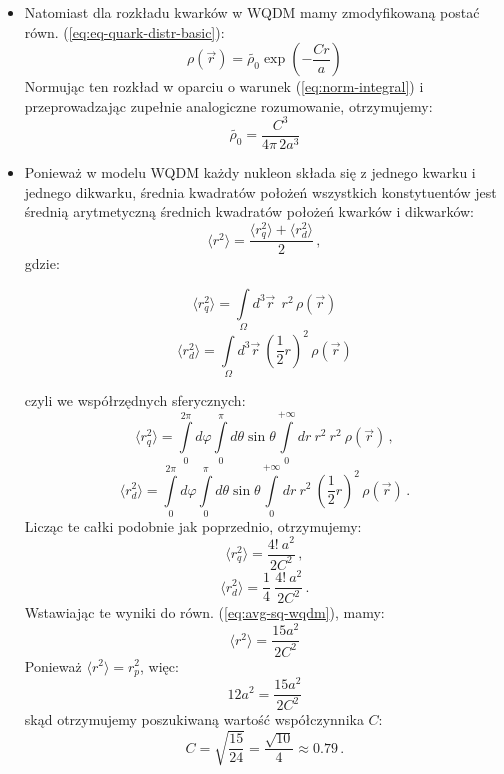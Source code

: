 \documentclass[a4paper,12pt]{article}
\begin{document}
\begin{itemize}
\item Natomiast dla rozkładu kwarków w WQDM mamy zmodyfikowaną postać równ. (\ref{eq:eq-quark-distr-basic}):
\begin{equation}
\rho(\vec{r}) = \widetilde{\rho_0} \exp\left(-\frac{Cr}{a}\right)
\end{equation}
Normując ten rozkład w oparciu o warunek (\ref{eq:norm-integral}) i przeprowadzając zupełnie analogiczne rozumowanie, otrzymujemy:
\begin{equation}\label{eq:coeff2}
\widetilde{\rho_0} = \frac{C^3}{4\pi \, 2a^3}
\end{equation}
\item Ponieważ w modelu WQDM każdy nukleon składa się z jednego kwarku i jednego dikwarku, średnia kwadratów położeń wszystkich konstytuentów jest średnią arytmetyczną średnich kwadratów położeń kwarków i dikwarków:
\begin{equation}\label{eq:avg-sq-wqdm}
\langle r^2 \rangle = \frac{\langle r_q^2 \rangle + \langle r_d^2 \rangle}{2}\,,
\end{equation}
gdzie: 

\begin{equation}
\langle r_q^2 \rangle = \int\limits_{\Omega} d^3\vec{r}\: \: r^2 \, \rho(\vec{r})
\end{equation}
\begin{equation}
\langle r_d^2 \rangle = \int\limits_{\Omega} d^3\vec{r}\: \left(\frac{1}{2}r\right)^2 \, \rho(\vec{r})
\end{equation}

czyli we współrzędnych sferycznych:
\[
\langle r_q^2 \rangle = \int\limits_{0}^{2\pi}d\varphi \int\limits_{0}^{\pi}d\theta \sin\theta \int\limits_{0}^{+\infty}dr \: r^2 \: r^2 \: \rho(\vec{r})\,,
\]
\[
\langle r_d^2 \rangle = \int\limits_{0}^{2\pi}d\varphi \int\limits_{0}^{\pi}d\theta \sin\theta \int\limits_{0}^{+\infty}dr \: r^2 \: \left(\frac{1}{2}r\right)^2 \, \rho(\vec{r})\,.
\]
Licząc te całki podobnie jak poprzednio, otrzymujemy:
\begin{equation}
\langle r_q^2 \rangle = \frac{4! \: a^2}{2C^2}\,,
\end{equation}
\begin{equation}
\langle r_d^2 \rangle = \frac{1}{4}\: \frac{4! \: a^2}{2C^2}\,.
\end{equation}
Wstawiając te wyniki do równ. (\ref{eq:avg-sq-wqdm}), mamy:
\begin{equation}
\langle r^2 \rangle = \frac{15 a^2}{2C^2}
\end{equation}
Ponieważ $\langle r^2 \rangle = r_p^2$, więc:
\[ 12a^2 = \frac{15 a^2}{2C^2}  \]
skąd otrzymujemy poszukiwaną wartość współczynnika $C$:
\begin{equation}
C= \sqrt{\frac{15}{24}} = \frac{\sqrt{10}}{4} \approx 0.79\,.
\end{equation}
\end{itemize}
\end{document}
